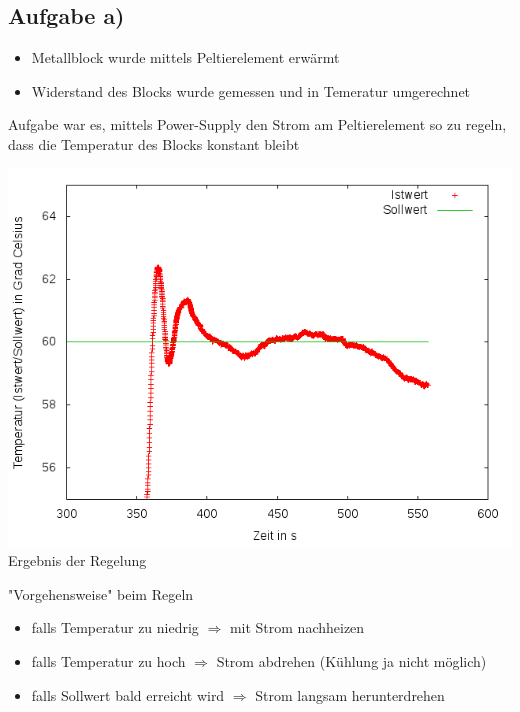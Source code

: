 \documentclass[compress,11pt]{beamer}
\begin{document}
\begin{frame}


\subsection{Aufgabe a)}
\begin{itemize}
\item Metallblock wurde mittels Peltierelement erwärmt
\item Widerstand des Blocks wurde gemessen und in Temeratur umgerechnet
\end{itemize}
Aufgabe war es, mittels Power-Supply den Strom am Peltierelement so zu regeln, dass die Temperatur des Blocks konstant bleibt
\end{frame}
\begin{frame}
\textsc{\includegraphics[width=.7\textwidth]{../2aufgabe/2a_T_genauer}\\}
Ergebnis der Regelung
\end{frame}
\begin{frame}
\begin{block}{"Vorgehensweise" beim Regeln}
\begin{itemize}
\item falls Temperatur zu niedrig $\Rightarrow$ mit Strom nachheizen
\item falls Temperatur zu hoch $\Rightarrow$ Strom abdrehen (Kühlung ja nicht möglich)
\item falls Sollwert bald erreicht wird $\Rightarrow$ Strom langsam herunterdrehen
\end{itemize}
\end{block}
\end{frame}
\end{document}
